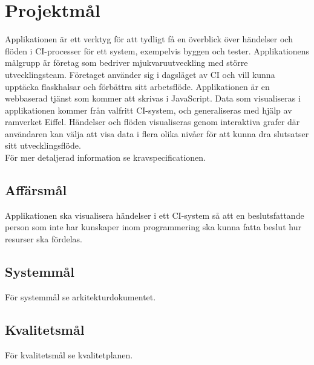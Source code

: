 \section{Projektmål}
Applikationen är ett verktyg för att tydligt få en överblick över händelser och flöden i CI-processer för ett system, exempelvis byggen och tester. Applikationens målgrupp är företag som bedriver mjukvaruutveckling med större utvecklingsteam. Företaget använder sig i dagsläget av CI och vill kunna upptäcka flaskhalsar och förbättra sitt arbetsflöde. Applikationen är en webbaserad tjänst som kommer att skrivas i JavaScript. Data som visualiseras i applikationen kommer från valfritt CI-system, och generaliseras med hjälp av ramverket Eiffel. Händelser och flöden visualiseras genom interaktiva grafer där användaren kan välja att visa data i flera olika nivåer för att kunna dra slutsatser sitt utvecklingsflöde. 
\\
För mer detaljerad information se kravspecificationen.

\iffalse
\begin{figure}[h]
    \centering
    \texttt{[image: Visualization]}
    \caption{De olika nivåerna av systemet, godtyckligt färgade.}
    \label{fig:system_overview}
\end{figure}
\fi

\subsection{Affärsmål}
Applikationen ska visualisera händelser i ett CI-system så att en beslutsfattande person som inte har kunskaper inom programmering ska kunna fatta beslut hur resurser ska fördelas.

\subsection{Systemmål}
För systemmål se arkitekturdokumentet.

\subsection{Kvalitetsmål}
För kvalitetsmål se kvalitetplanen.
